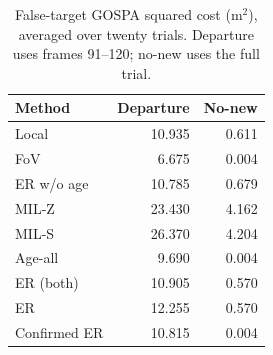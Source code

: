 \begin{table}[t]
\centering
\caption{False-target GOSPA squared cost (m$^2$), averaged over twenty trials. Departure uses frames 91--120; no-new uses the full trial.}
\label{tab:false}
\small
\begin{tabular}{lrr}
\toprule
Method & Departure & No-new\\
\midrule
Local & 10.935 & 0.611\\
FoV & 6.675 & 0.004\\
ER w/o age & 10.785 & 0.679\\
MIL-Z & 23.430 & 4.162\\
MIL-S & 26.370 & 4.204\\
Age-all & 9.690 & 0.004\\
ER (both) & 10.905 & 0.570\\
ER & 12.255 & 0.570\\
Confirmed ER & 10.815 & 0.004\\
\bottomrule
\end{tabular}
\end{table}

